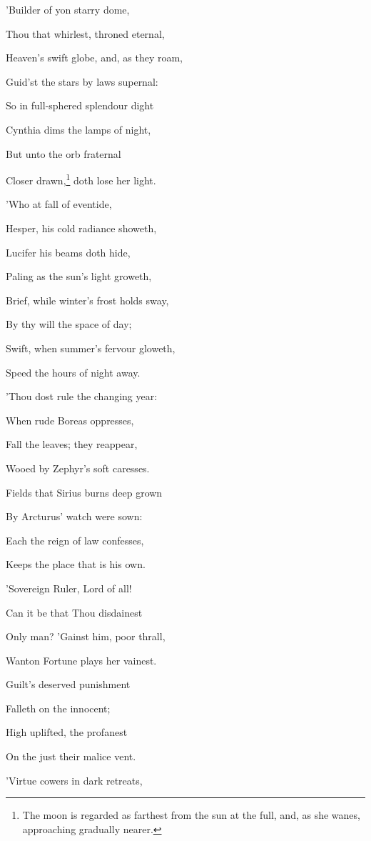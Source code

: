 
'Builder of yon starry dome,

Thou that whirlest, throned eternal,

Heaven's swift globe, and, as they roam,

Guid'st the stars by laws supernal:

So in full-sphered splendour dight

Cynthia dims the lamps of night,

But unto the orb fraternal

Closer drawn,\footnote{The moon is regarded as farthest from the sun at the full,
and, as she wanes, approaching gradually nearer.} doth lose her light.

'Who at fall of eventide,

Hesper, his cold radiance showeth,

Lucifer his beams doth hide,

Paling as the sun's light groweth,

Brief, while winter's frost holds sway,

By thy will the space of day;

Swift, when summer's fervour gloweth,

Speed the hours of night away.

'Thou dost rule the changing year:

When rude Boreas oppresses,

Fall the leaves; they reappear,

Wooed by Zephyr's soft caresses.

Fields that Sirius burns deep grown

By Arcturus' watch were sown:

Each the reign of law confesses,

Keeps the place that is his own.

'Sovereign Ruler, Lord of all!

Can it be that Thou disdainest

Only man? 'Gainst him, poor thrall,

Wanton Fortune plays her vainest.

Guilt's deserved punishment

Falleth on the innocent;

High uplifted, the profanest

On the just their malice vent.

'Virtue cowers in dark retreats,


